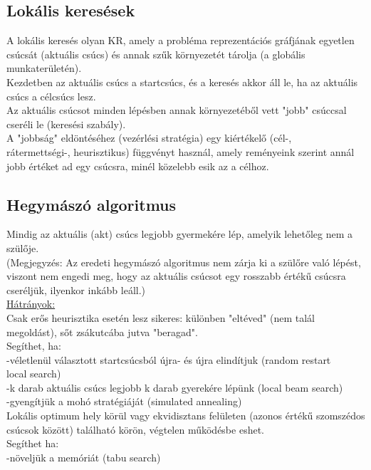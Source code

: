 \documentclass{article}
\begin{document}
	 \subsection{Lokális keresések}
	 A lokális keresés olyan KR, amely a probléma reprezentációs gráfjának egyetlen csúcsát (aktuális csúcs) és annak szűk környezetét tárolja (a globális munkaterületén).\\
	 Kezdetben az aktuális csúcs a startcsúcs, és a keresés akkor áll le, ha az aktuális csúcs a célcsúcs lesz.\\
	 Az aktuális csúcsot minden lépésben annak környezetéből vett "jobb" csúccsal cseréli le (keresési szabály).\\
	 A "jobbság" eldöntéséhez (vezérlési stratégia) egy kiértékelő (cél-,\\ rátermettségi-, heurisztikus) függvényt használ, amely reményeink szerint annál jobb értéket ad egy csúcsra, minél közelebb esik az a célhoz.
	 
	 \subsection{Hegymászó algoritmus}
	 Mindig az aktuális (akt) csúcs legjobb gyermekére lép, amelyik lehetőleg nem a szülője.\\
	 (Megjegyzés: Az eredeti hegymászó algoritmus nem zárja ki a szülőre való lépést, viszont nem engedi meg, hogy az aktuális csúcsot egy rosszabb értékű csúcsra cseréljük, ilyenkor inkább leáll.)\\
	 \underline{Hátrányok:}\\
	 Csak erős heurisztika esetén lesz sikeres: különben "eltéved" (nem talál megoldást), sőt zsákutcába jutva "beragad".\\
	 Segíthet, ha:\\
	 \hspace*{0,5em} -véletlenül választott startcsúcsból újra- és újra elindítjuk (random restart\\ \hspace*{1,1em}local search)\\
	 \hspace*{0,5em} -k darab aktuális csúcs legjobb k darab gyerekére lépünk (local beam search)\\
	 \hspace*{0,5em} -gyengítjük a mohó stratégiáját (simulated annealing)\\
	 Lokális optimum hely körül vagy ekvidisztans felületen (azonos értékű szomszédos csúcsok között) található körön, végtelen működésbe eshet.\\
	 Segíthet ha:\\
	 \hspace*{0,5em} -növeljük a memóriát (tabu search)\\ \\
	 
\end{document}
